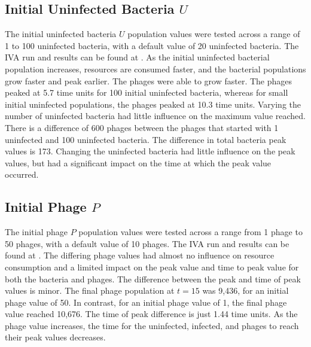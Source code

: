 \subsection{Initial Uninfected Bacteria $U$}
The initial uninfected bacteria $U$ population values were tested across a range of 1 to 100 uninfected bacteria, with a default value of 20 uninfected bacteria. 
The IVA run and results can be found at . 
As the initial uninfected bacterial population increases, resources are consumed faster, and the bacterial populations grow faster and peak earlier. The phages were able to grow faster. The phages peaked at 5.7 time units for 100 initial uninfected bacteria, whereas for small initial uninfected populations, the phages peaked at 10.3 time units. Varying the number of uninfected bacteria had little influence on the maximum value reached. There is a difference of 600 phages between the phages that started with 1 uninfected and 100 uninfected bacteria. The difference in total bacteria peak values is 173. Changing the uninfected bacteria had little influence on the peak values, but had a significant impact on the time at which the peak value occurred. \\

\subsection{Initial Phage $P$}
The initial phage $P$ population values were tested across a range from 1 phage to 50 phages, with a default value of 10 phages. 
The IVA run and results can be found at . 
The differing phage values had almost no influence on resource consumption and a limited impact on the peak value and time to peak value for both the bacteria and phages. 
The difference between the peak and time of peak values is minor. 
The final phage population at $t=15$ was 9,436, for an initial phage value of 50. In contrast, for an initial phage value of 1, the final phage value reached 10,676. 
The time of peak difference is just 1.44 time units. 
As the phage value increases, the time for the uninfected, infected, and phages to reach their peak values decreases. 


